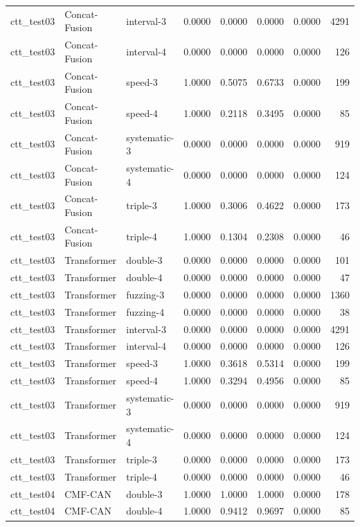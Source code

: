 \begin{tabular}{lllrrrrr}
ctt\_test03 & Concat-Fusion & interval-3 & 0.0000 & 0.0000 & 0.0000 & 0.0000 & 4291 \\
ctt\_test03 & Concat-Fusion & interval-4 & 0.0000 & 0.0000 & 0.0000 & 0.0000 & 126 \\
ctt\_test03 & Concat-Fusion & speed-3 & 1.0000 & 0.5075 & 0.6733 & 0.0000 & 199 \\
ctt\_test03 & Concat-Fusion & speed-4 & 1.0000 & 0.2118 & 0.3495 & 0.0000 & 85 \\
ctt\_test03 & Concat-Fusion & systematic-3 & 0.0000 & 0.0000 & 0.0000 & 0.0000 & 919 \\
ctt\_test03 & Concat-Fusion & systematic-4 & 0.0000 & 0.0000 & 0.0000 & 0.0000 & 124 \\
ctt\_test03 & Concat-Fusion & triple-3 & 1.0000 & 0.3006 & 0.4622 & 0.0000 & 173 \\
ctt\_test03 & Concat-Fusion & triple-4 & 1.0000 & 0.1304 & 0.2308 & 0.0000 & 46 \\
ctt\_test03 & Transformer & double-3 & 0.0000 & 0.0000 & 0.0000 & 0.0000 & 101 \\
ctt\_test03 & Transformer & double-4 & 0.0000 & 0.0000 & 0.0000 & 0.0000 & 47 \\
ctt\_test03 & Transformer & fuzzing-3 & 0.0000 & 0.0000 & 0.0000 & 0.0000 & 1360 \\
ctt\_test03 & Transformer & fuzzing-4 & 0.0000 & 0.0000 & 0.0000 & 0.0000 & 38 \\
ctt\_test03 & Transformer & interval-3 & 0.0000 & 0.0000 & 0.0000 & 0.0000 & 4291 \\
ctt\_test03 & Transformer & interval-4 & 0.0000 & 0.0000 & 0.0000 & 0.0000 & 126 \\
ctt\_test03 & Transformer & speed-3 & 1.0000 & 0.3618 & 0.5314 & 0.0000 & 199 \\
ctt\_test03 & Transformer & speed-4 & 1.0000 & 0.3294 & 0.4956 & 0.0000 & 85 \\
ctt\_test03 & Transformer & systematic-3 & 0.0000 & 0.0000 & 0.0000 & 0.0000 & 919 \\
ctt\_test03 & Transformer & systematic-4 & 0.0000 & 0.0000 & 0.0000 & 0.0000 & 124 \\
ctt\_test03 & Transformer & triple-3 & 0.0000 & 0.0000 & 0.0000 & 0.0000 & 173 \\
ctt\_test03 & Transformer & triple-4 & 0.0000 & 0.0000 & 0.0000 & 0.0000 & 46 \\
ctt\_test04 & CMF-CAN & double-3 & 1.0000 & 1.0000 & 1.0000 & 0.0000 & 178 \\
ctt\_test04 & CMF-CAN & double-4 & 1.0000 & 0.9412 & 0.9697 & 0.0000 & 85 \\

\end{tabular}
